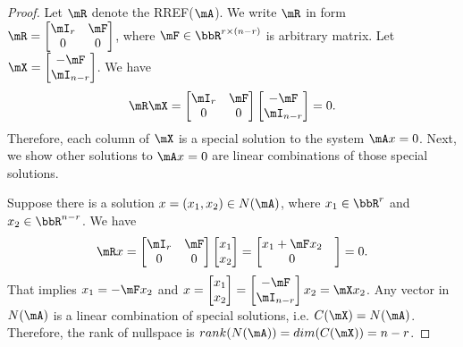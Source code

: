 \documentclass[11pt]{article}
\theoremstyle{plain}
\theoremstyle{definition}
\begin{document}
\begin{proof} Let $\mR$ denote the RREF($\mA$).  We write $\mR$  in form $\mR = \begin{bmatrix} \mI_r & \mF \\ 0 & 0	\end{bmatrix}$, where $\mF \in \bbR^{ r \times (n-r)}$ is arbitrary matrix.
Let $\mX = \begin{bmatrix} -\mF \\ \mI_{n-r}	\end{bmatrix}$.  We have 
\begin{align}
	\mR \mX = \begin{bmatrix} \mI_r & \mF \\ 0 & 0	\end{bmatrix} \begin{bmatrix} -\mF \\ \mI_{n-r}	\end{bmatrix} = 0.
\end{align}
Therefore, each column of $\mX$ is a special solution to the system $\mA x = 0$. Next, we show other solutions to $\mA x = 0$ are linear combinations of those special solutions.

Suppose there is a solution $x = (x_1, x_2) \in N(\mA)$, where $x_1 \in \bbR^{r}$ and $x_2 \in \bbR^{n-r}$. We have 
\begin{align}
	\mR x = \begin{bmatrix} \mI_r & \mF \\ 0 & 0	\end{bmatrix} \begin{bmatrix} x_1 \\ x_2	\end{bmatrix} = \begin{bmatrix} x_1 + \mF x_2 \\  0 &\end{bmatrix} = 0.
\end{align}
That implies $x_1  = -\mF x_2$ and $x = \begin{bmatrix} x_1 \\ x_2	\end{bmatrix} = \begin{bmatrix} -\mF \\ \mI_{n-r}	\end{bmatrix} x_2 = \mX x_2$. Any vector  in $ N(\mA)$ is a linear combination of special solutions, i.e. $C(\mX) = N(\mA)$. Therefore, the rank of nullspace is $rank(N(\mA)) = dim(C(\mX)) = n-r$.
\end{proof}
\end{document}
